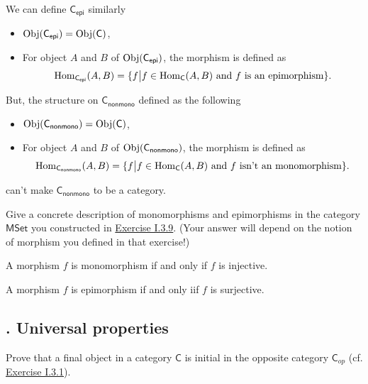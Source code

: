 \begin{solution}
We can define $\mathsf{C}_\mathsf{epi}$ similarly
\begin{itemize}
    \item $\mathrm{Obj}(\mathsf{C}_\mathsf{epi})=\mathrm{Obj}(\mathsf{C})$,
    \item For object $A$ and $B$ of $\mathrm{Obj}(\mathsf{C}_\mathsf{epi})$, the morphism is defined as
    $$\mathrm{Hom}_{\mathsf{C}_\mathsf{epi}}(A,B) = \{f\big{|} f\in \mathrm{Hom}_{\mathsf{C}}(A,B) \text{ and } f \text{ is an epimorphism}\}.$$
\end{itemize}

But, the structure on $\mathsf{C}_\mathsf{nonmono}$ defined as the following 
\begin{itemize}
    \item $\mathrm{Obj}(\mathsf{C}_\mathsf{nonmono})=\mathrm{Obj}(\mathsf{C})$,
    \item For object $A$ and $B$ of $\mathrm{Obj}(\mathsf{C}_\mathsf{nonmono})$, the morphism is defined as
    $$\mathrm{Hom}_{\mathsf{C}_\mathsf{nonmono}}(A,B) = \{f\big{|} f\in \mathrm{Hom}_{\mathsf{C}}(A,B) \text{ and } f \text{ isn't an monomorphism}\}.$$
\end{itemize}
can't make $\mathsf{C}_\mathsf{nonmono}$ to be a category.
\end{solution}

\begin{problem}[4.5]
  Give a concrete description of monomorphisms and epimorphisms in the category
  $\mathsf{MSet}$ you constructed in \hyperlink{Exercise I.3.9}{Exercise I.3.9}. (Your answer will depend on the notion
  of morphism you defined in that exercise!)
\end{problem}

\begin{solution}
A morphism $f$ is monomorphism if and only if $f$ is injective.

\noindent A morphism $f$ is epimorphism if and only iif $f$ is surjective.
\end{solution}

\subsection{. Universal properties}


\begin{problem}[5.1]
  Prove that a final object in a category $\mathsf{C}$ is initial in the opposite category $\mathsf{C}_{op}$  (cf. \hyperlink{Exercise I.3.1}{Exercise I.3.1}).
\end{problem}

